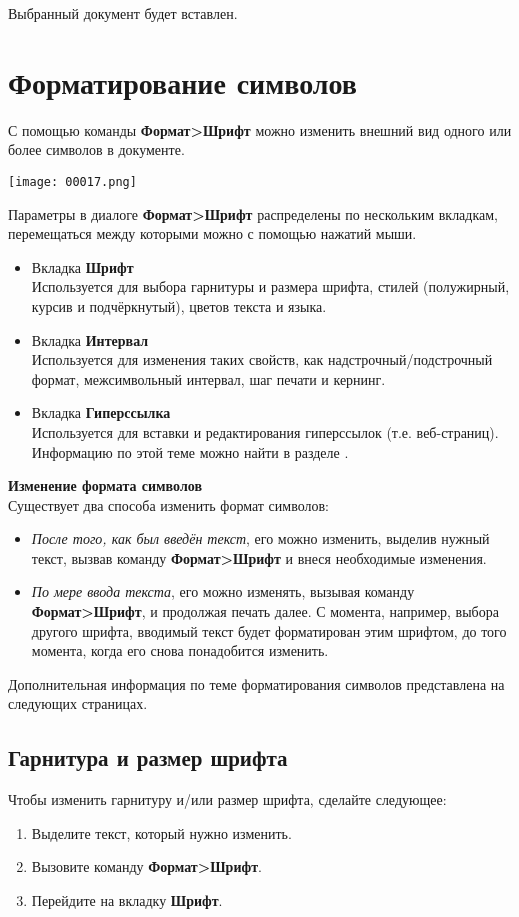 ﻿\documentclass[a4paper,10pt]{article}
\begin{document}
Выбранный документ будет вставлен.

\section{Форматирование символов} \label{sec:фс}
С помощью команды \textbf{Формат>Шрифт} можно изменить внешний вид одного или более символов в документе.

\texttt{[image: 00017.png]}

Параметры в диалоге \textbf{Формат>Шрифт} распределены по нескольким вкладкам, перемещаться между которыми можно с помощью нажатий мыши.
\begin{itemize}
 \item Вкладка \textbf{Шрифт}\\
Используется для выбора гарнитуры и размера шрифта, стилей (полужирный, курсив и подчёркнутый), цветов текста и языка.
\item Вкладка \textbf{Интервал}\\
Используется для изменения таких свойств, как надстрочный/подстрочный формат, межсимвольный интервал, шаг печати и кернинг.
\item Вкладка \textbf{Гиперссылка}\\
Используется для вставки и редактирования гиперссылок (т.е. веб-страниц). Информацию по этой теме можно найти в разделе .
\end{itemize}

\textbf{Изменение формата символов}\\
Существует два способа изменить формат символов:
\begin{itemize}
 \item \textit{После того, как был введён текст}, его можно изменить, выделив нужный текст, вызвав команду \textbf{Формат>Шрифт} и внеся необходимые изменения.
 \item \textit{По мере ввода текста}, его можно изменять, вызывая команду \textbf{Формат>Шрифт}, и продолжая печать далее. С момента, например, выбора другого шрифта, вводимый текст будет форматирован этим шрифтом, до того момента, когда его снова понадобится изменить.
\end{itemize}

Дополнительная информация по теме форматирования символов представлена на следующих страницах.

\subsection{Гарнитура и размер шрифта}
Чтобы изменить гарнитуру и/или размер шрифта, сделайте следующее:
\begin{enumerate}
 \item Выделите текст, который нужно изменить.
\item Вызовите команду \textbf{Формат>Шрифт}.
\item Перейдите на вкладку \textbf{Шрифт}.
\end{enumerate}
\end{document}
